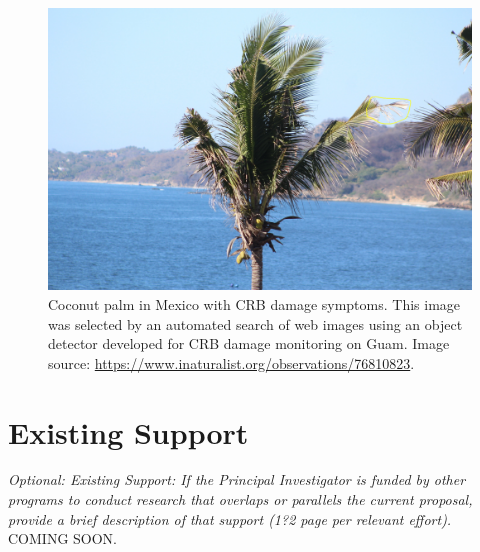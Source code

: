 \documentclass[11pt,english,letterpaper]{scrartcl}
\begin{document}
\begin{figure}[H]
	\centering
	\includegraphics[width=0.7\linewidth]{images/crb-mexico}
	\caption{Coconut palm in Mexico with CRB damage symptoms. This image was selected by an automated search of web images using an object detector developed for CRB damage monitoring on Guam. Image source: \url{https://www.inaturalist.org/observations/76810823}.}	
	\label{fig:crb-mexico}
\end{figure}


	


	
%
\clearpage
\section{Existing Support}

\textit{Optional: Existing Support: If the Principal Investigator is funded by other programs to conduct research that overlaps or parallels the current proposal, provide a brief description of that support (1?2 page per relevant effort).} \\

COMING SOON.
\end{document}

